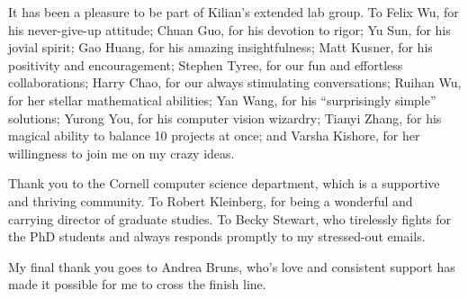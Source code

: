 It has been a pleasure to be part of Kilian's extended lab group.
To Felix Wu, for his never-give-up attitude; Chuan Guo, for his devotion to rigor; Yu Sun, for his jovial spirit; Gao Huang, for his amazing insightfulness;
Matt Kusner, for his positivity and encouragement; Stephen Tyree, for our fun and effortless collaborations;
Harry Chao, for our always stimulating conversations;
Ruihan Wu, for her stellar mathematical abilities;
Yan Wang, for his ``surprisingly simple'' solutions;
Yurong You, for his computer vision wizardry;
Tianyi Zhang, for his magical ability to balance 10 projects at once;
and Varsha Kishore, for her willingness to join me on my crazy ideas.

Thank you to the Cornell computer science department, which is a supportive and thriving community.
To Robert Kleinberg, for being a wonderful and carrying director of graduate studies.
To Becky Stewart, who tirelessly fights for the PhD students and always responds promptly to my stressed-out emails.

My final thank you goes to Andrea Bruns, who's love and consistent support has made it possible for me to cross the finish line.
